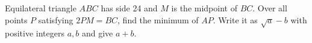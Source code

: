 Equilateral triangle $ABC$ has side 24 and $M$ is the midpoint of $BC$. Over all points $P$ satisfying $2PM=BC$, find the minimum of $AP$. Write it as $\sqrt a-b$ with positive integers $a,b$ and give $a+b$.
